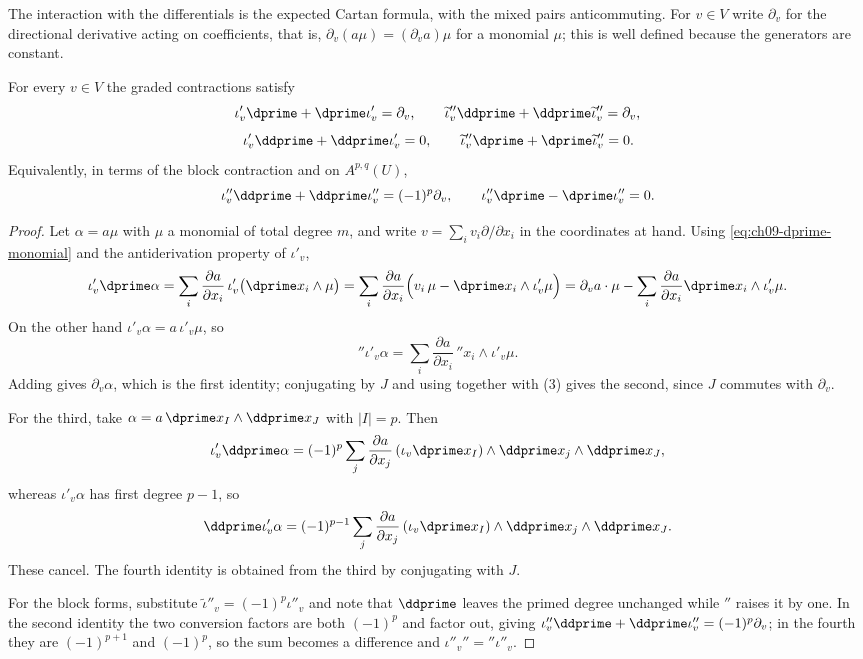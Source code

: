 The interaction with the differentials is the expected Cartan formula, with
the mixed pairs anticommuting.  For $v\in V$ write $\partial_v$ for the
directional derivative acting on coefficients, that is,
$\partial_v(a\mu)=(\partial_va)\mu$ for a monomial $\mu$; this is well
defined because the generators are constant.

\begin{proposition}
\label{prop:ch09-cartan}
For every $v\in V$ the graded contractions satisfy
\[
 \iota'_v\dprime+\dprime\iota'_v=\partial_v,
 \qquad
 \widetilde\iota''_v\ddprime+\ddprime\widetilde\iota''_v=\partial_v,
\]
\[
 \iota'_v\ddprime+\ddprime\iota'_v=0,
 \qquad
 \widetilde\iota''_v\dprime+\dprime\widetilde\iota''_v=0 .
\]
Equivalently, in terms of the block contraction and on $A^{p,q}(U)$,
\[
 \iota''_v\ddprime+\ddprime\iota''_v=(-1)^p\partial_v,
 \qquad
 \iota''_v\dprime-\dprime\iota''_v=0 .
\]
\end{proposition}

\begin{proof}
Let $\alpha=a\mu$ with $\mu$ a monomial of total degree $m$, and write
$v=\sum_iv_i\partial/\partial x_i$ in the coordinates at hand.  Using
\eqref{eq:ch09-dprime-monomial} and the antiderivation property of
$\iota'_v$,
\[
 \iota'_v\dprime\alpha
 =\sum_i\frac{\partial a}{\partial x_i}\,
   \iota'_v\bigl(\dprime x_i\wedge\mu\bigr)
 =\sum_i\frac{\partial a}{\partial x_i}
   \Bigl(v_i\,\mu-\dprime x_i\wedge\iota'_v\mu\Bigr)
 =\partial_va\cdot\mu
   -\sum_i\frac{\partial a}{\partial x_i}\dprime x_i\wedge\iota'_v\mu .
\]
On the other hand $\iota'_v\alpha=a\,\iota'_v\mu$, so
\[
 \dprime\iota'_v\alpha
 =\sum_i\frac{\partial a}{\partial x_i}\,\dprime x_i\wedge\iota'_v\mu .
\]
Adding gives $\partial_v\alpha$, which is the first identity; conjugating by
$J$ and using  together with
(3) gives the second, since $J$ commutes
with $\partial_v$.

For the third, take $\alpha=a\,\dprime x_I\wedge\ddprime x_J$ with $|I|=p$.
Then
\[
 \iota'_v\ddprime\alpha
 =(-1)^{p}\sum_j\frac{\partial a}{\partial x_j}\,
   (\iota_v\dprime x_I)\wedge\ddprime x_j\wedge\ddprime x_J ,
\]
whereas $\iota'_v\alpha$ has first degree $p-1$, so
\[
 \ddprime\iota'_v\alpha
 =(-1)^{p-1}\sum_j\frac{\partial a}{\partial x_j}\,
   (\iota_v\dprime x_I)\wedge\ddprime x_j\wedge\ddprime x_J .
\]
These cancel.  The fourth identity is obtained from the third by conjugating
with $J$.

For the block forms, substitute $\widetilde\iota''_v=(-1)^p\iota''_v$ and
note that $\ddprime$ leaves the primed degree unchanged while $\dprime$
raises it by one.  In the second identity the two conversion factors are both
$(-1)^p$ and factor out, giving
$\iota''_v\ddprime+\ddprime\iota''_v=(-1)^p\partial_v$; in the fourth they are
$(-1)^{p+1}$ and $(-1)^p$, so the sum becomes a difference and
$\iota''_v\dprime=\dprime\iota''_v$.
\end{proof}

